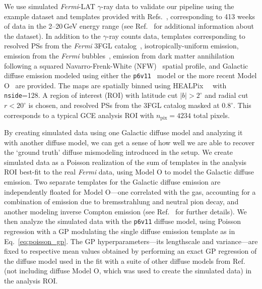 \documentclass[]{article}
\begin{document}
We use simulated \emph{Fermi}-LAT $\gamma$-ray data to validate our pipeline using the example dataset and templates provided with Refs.~\cite{Mishra-Sharma:2016gis,Buschmann:2020adf}, corresponding to 413 weeks of data in the 2--20\,GeV energy range (see Ref.~\cite{Mishra-Sharma:2016gis} for additional information about the dataset). In addition to the $\gamma$-ray counts data, templates corresponding to resolved PSs from the \emph{Fermi} 3FGL catalog~\cite{Acero:2015hja}, isotropically-uniform emission, emission from the \emph{Fermi} bubbles~\cite{Su:2010qj}, emission from dark matter annihilation following a squared Navarro-Frenk-White (NFW)~\cite{Navarro:1995iw,Navarro:1996gj} spatial profile, and Galactic diffuse emission modeled using either the \texttt{p6v11}~\cite{p6v11} model or the more recent Model O~\cite{Buschmann:2020adf} are provided. The maps are spatially binned using HEALPix~~\cite{Gorski:2004by,Zonca2019} with \texttt{nside}=128. A region of interest (ROI) with latitude cut $|b| > 2^\circ$ and radial cut $r < 20^\circ$ is chosen, and resolved PSs from the 3FGL catalog masked at $0.8^\circ$. This corresponds to a typical GCE analysis ROI with $n_\mathrm{pix}=4234$ total pixels. 

By creating simulated data using one Galactic diffuse model and analyzing it with another diffuse model, we can get a sense of how well we are able to recover the `ground truth' diffuse mismodeling introduced in the setup. We create simulated data as a Poisson realization of the sum of templates in the analysis ROI best-fit to the real \emph{Fermi} data, using Model O to model the Galactic diffuse emission. Two separate templates for the Galactic diffuse emission are independently floated for Model O---one correlated with the gas, accounting for a combination of emission due to bremsstrahlung and neutral pion decay, and another modeling inverse Compton emission (see Ref.~\cite{Buschmann:2020adf} for further details).  We then analyze the simulated data with the \texttt{p6v11} diffuse model, using Poisson regression with a GP modulating the single diffuse emission template as in Eq.~\eqref{eq:poisson_gp}. The GP hyperparameters---its lengthscale and variance---are fixed to respective mean values obtained by performing an exact GP regression of the diffuse model used in the fit with a suite of other diffuse models from Ref.~\cite{Ackermann:2014usa} (not including diffuse Model O, which was used to create the simulated data) in the analysis ROI.
\end{document}
